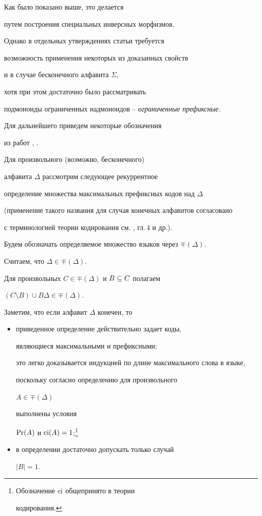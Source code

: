  Как было показано выше, это делается


 путем построения специальных инверсных морфизмов.


\setcounter{footnote}{0}





 Однако в отдельных утверждениях статьи \cite{medu} требуется


 возможность применения некоторых из доказанных свойств


 и в случае бесконечного алфавита $\Sigma$,


 хотя при этом достаточно было рассматривать


 подмоноиды ограниченных надмоноидов -- {\it ограниченные префиксные\/}.





 Для дальнейшего приведем некоторые обозначения


 из работ \cite{io13}, \cite{medu}.


 Для произвольного (возможно, бесконечного)


 алфавита $\Delta$ рассмотрим следующее рекуррентное


 определение множества максимальных префиксных кодов над $\Delta$


 (применение такого названия для случая конечных алфавитов согласовано


 с терминологией теории кодирования см. \cite{sal}, гл.\,4 и др.).


 Будем обозначать определяемое множество языков через $\mp(\Delta)$.





Считаем, что $\Delta\in\mp(\Delta)$.


Для произвольных $C\in\mp(\Delta)$ и $B\subseteq C$ полагаем


$(C\setminus B)\cup B\Delta \in \mp(\Delta)$.


 Заметим, что если алфавит $\Delta$ конечен, то


 \begin{itemize}


 \item[--]


 приведенное определение действительно задает коды,


 являющиеся максимальными и префиксными;


 это легко доказывается индукцией по длине максимального слова в языке,


 поскольку согласно определению для произвольного


$A\in\mp(\Delta)$


выполнены условия


$\operatorname{Pr}(A)$ и $\operatorname{ci}(A)=1$;\footnote{Обозначение $\operatorname{ci}$ общепринято в теории 


кодирования.}


 \item[--] в определении достаточно допускать только случай


$|B|=1$.


 \end{itemize}



